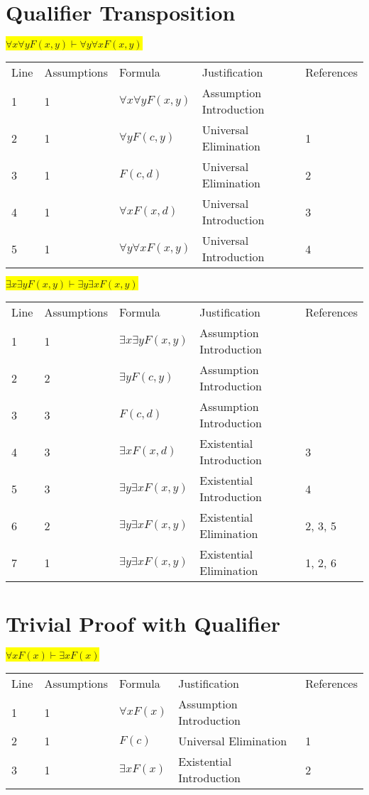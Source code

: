 \documentclass[12pt]{article}
\newcommand{\pr}[1]{\bigbreak \colorbox{Yellow}{$#1$} \smallbreak}
\begin{document}
\begin{flushleft}
\section{Qualifier Transposition}
\pr{\forall x \forall y F(x,y) \vdash \forall y \forall x F(x,y)}
\begin{tabular}{lllll}
    Line & Assumptions & Formula & Justification & References \\
    1 & 1 & $\forall x\forall yF(x,y)$  & Assumption Introduction &  \\
    2 & 1 & $\forall yF(c,y)$  & Universal Elimination & 1 \\
    3 & 1 & $F(c,d)$  & Universal Elimination & 2 \\
    4 & 1 & $\forall xF(x,d)$  & Universal Introduction & 3 \\
    5 & 1 & $\forall y\forall xF(x,y)$  & Universal Introduction & 4 \\
\end{tabular}

\pr{\exists x \exists y F(x,y) \vdash \exists y \exists x F(x,y)}
\begin{tabular}{lllll}
    Line & Assumptions & Formula & Justification & References \\
    1 & 1 & $\exists x\exists yF(x,y)$  & Assumption Introduction &  \\
    2 & 2 & $\exists yF(c,y)$  & Assumption Introduction &  \\
    3 & 3 & $F(c,d)$  & Assumption Introduction &  \\
    4 & 3 & $\exists xF(x,d)$  & Existential Introduction & 3 \\
    5 & 3 & $\exists y\exists xF(x,y)$  & Existential Introduction & 4 \\
    6 & 2 & $\exists y\exists xF(x,y)$  & Existential Elimination & 2, 3, 5 \\
    7 & 1 & $\exists y\exists xF(x,y)$  & Existential Elimination & 1, 2, 6 \\
\end{tabular}

\section{Trivial Proof with Qualifier}
\pr{\forall x F(x) \vdash \exists x F(x)}
\begin{tabular}{lllll}
    Line & Assumptions & Formula & Justification & References \\
    1 & 1 & $\forall xF(x)$  & Assumption Introduction &  \\
    2 & 1 & $F(c)$  & Universal Elimination & 1 \\
    3 & 1 & $\exists xF(x)$  & Existential Introduction & 2 \\
\end{tabular}


\end{flushleft}
\end{document}
